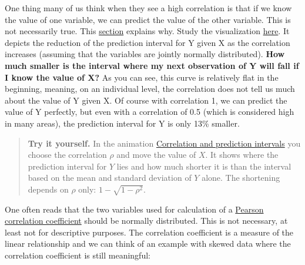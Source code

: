 \documentclass[
]{book}
\begin{document}
One thing many of us think when they see a high correlation is that if we know the value of one variable,
we can predict the value of the other variable. This is not necessarily true.
This \href{https://en.wikipedia.org/wiki/Pearson_correlation_coefficient\#Interpretation}{section} explains why.
Study the visualization \href{https://en.wikipedia.org/wiki/Pearson_correlation_coefficient\#/media/File:Pearson_correlation_and_prediction_intervals.svg}{here}.
It depicts the reduction of the prediction interval for Y given X as the correlation
increases (assuming that the variables are jointly normally distributed). \textbf{How much smaller is the interval where my next observation of Y
will fall if I know the value of X?} As you can see, this curve is relatively flat in the beginning, meaning, on an individual level,
the correlation does not tell us much about the value of Y given X.
Of course with correlation 1, we can predict the value of Y perfectly, but even with a correlation of 0.5
(which is considered high in many areas), the prediction interval for Y is only 13\% smaller.

\begin{quote}
\textbf{Try it yourself.} In the animation
\href{https://jdegenfellner.github.io/Script_QM1_ZHAW/animations/15_Prediction_Intervals_Korrelation.html}{Correlation and prediction intervals}
you choose the correlation \(\rho\) and move the value of \(X\). It shows where the prediction interval for \(Y\) lies
and how much shorter it is than the interval based on the mean and standard deviation of \(Y\) alone.
The shortening depends on \(\rho\) only: \(1 - \sqrt{1 - \rho^2}\).
\end{quote}

One often reads that the two variables used for calculation of a
\href{https://en.wikipedia.org/wiki/Pearson_correlation_coefficient}{Pearson correlation coefficient} should be normally distributed.
This is not necessary, at least not for descriptive purposes. The correlation coefficient is a measure of the linear relationship
and we can think of an example with skewed data where the correlation coefficient is still meaningful:
\end{document}
